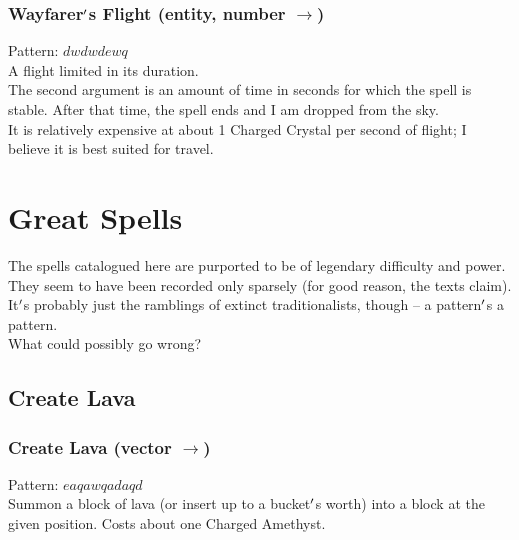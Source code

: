 \documentclass[12pt]{article}
\begin{document}
  \label{sec: patterns/spells/flight@hexcasting:flight/time}
\subsubsection*{Wayfarer$\rq$s Flight (entity, number $\rightarrow$)}

    Pattern: $dwdwdewq$\\
      A flight limited in its duration.\\


  
    The second argument is an amount of time in seconds for which the spell is stable. After that time, the spell ends and I am dropped from the sky. \\It is relatively expensive at about 1 Charged Crystal per second of flight; I believe it is best suited for travel.\\

\newpage

\label{sec:patterns/great_spells}

\section*{Great Spells}
  The spells catalogued here are purported to be of legendary difficulty and power. They seem to have been recorded only sparsely (for good reason, the texts claim). It$\rq$s probably just the ramblings of extinct traditionalists, though -- a pattern$\rq$s a pattern.\\What could possibly go wrong?\\



\label{sec:patterns/great_spells/create_lava}
\subsection*{Create Lava}


  \label{sec: patterns/great_spells/create_lava@hexcasting:create_lava}
\subsubsection*{Create Lava (vector $\rightarrow$)}

    Pattern: $eaqawqadaqd$\\
      Summon a block of lava (or insert up to a bucket$\rq$s worth) into a block at the given position. Costs about one Charged Amethyst.\\
\end{document}
